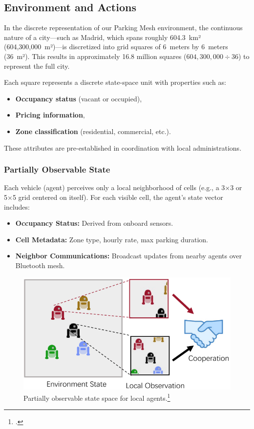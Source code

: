 \subsection{Environment and Actions}
In the discrete representation of our Parking Mesh environment, the continuous nature of a city—such as Madrid, which spans roughly 604.3~km² (604,300,000~m²)—is discretized into grid squares of 6~meters by 6~meters (36~m²). This results in approximately 16.8 million squares (\(604,300,000 \div 36\)) to represent the full city.

Each square represents a discrete state-space unit with properties such as:
\begin{itemize}
    \item \textbf{Occupancy status} (vacant or occupied),
    \item \textbf{Pricing information},
    \item \textbf{Zone classification} (residential, commercial, etc.).
\end{itemize}

These attributes are pre-established in coordination with local administrations.

\subsubsection*{Partially Observable State}\leavevmode

Each vehicle (agent) perceives only a local neighborhood of cells (e.g., a 3×3 or 5×5 grid centered on itself). For each visible cell, the agent’s state vector includes:
\begin{itemize}
    \item \textbf{Occupancy Status:} Derived from onboard sensors.
    \item \textbf{Cell Metadata:} Zone type, hourly rate, max parking duration.
    \item \textbf{Neighbor Communications:} Broadcast updates from nearby agents over Bluetooth mesh.
\end{itemize}

\begin{figure}[H]
    \centering
    \includegraphics[width=0.8\linewidth]{Figures/partial_observation.png}
    \captionsetup{justification=centering}
    \caption{Partially observable state space for local agents.\footcite{moonlightMARL}}
    \label{fig:partial-observability}
\end{figure}
